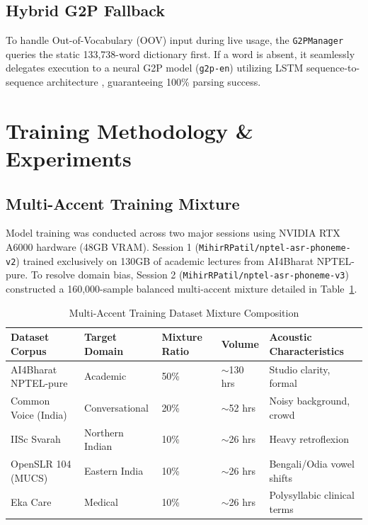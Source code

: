 \documentclass[11pt,a4paper]{article}
\begin{document}
\subsection{Hybrid G2P Fallback}
To handle Out-of-Vocabulary (OOV) input during live usage, the \texttt{G2PManager} queries the static 133,738-word dictionary first. If a word is absent, it seamlessly delegates execution to a neural G2P model (\texttt{g2p-en}) utilizing LSTM sequence-to-sequence architecture \cite{rao2015g2p}, guaranteeing 100\% parsing success.

\section{Training Methodology \& Experiments}\label{sec5}

\subsection{Multi-Accent Training Mixture}
Model training was conducted across two major sessions using NVIDIA RTX A6000 hardware (48GB VRAM). Session 1 (\texttt{MihirRPatil/}\allowbreak\texttt{nptel-asr-phoneme-v2}) trained exclusively on 130GB of academic lectures from AI4Bharat NPTEL-pure. To resolve domain bias, Session 2 (\texttt{MihirRPatil/}\allowbreak\texttt{nptel-asr-phoneme-v3}) constructed a 160,000-sample balanced multi-accent mixture detailed in Table~\ref{tab:dataset_composition}.

\begin{table}[h]
    \centering
    \caption{Multi-Accent Training Dataset Mixture Composition}\label{tab:dataset_composition}
    \vspace{0.5em}
    \begin{tabular}{p{3.5cm} p{3.0cm} p{1.8cm} p{1.8cm} p{4.0cm}}
        \toprule
        \textbf{Dataset Corpus} & \textbf{Target Domain} & \textbf{Mixture Ratio} & \textbf{Volume} & \textbf{Acoustic Characteristics} \\
        \midrule
        AI4Bharat NPTEL-pure & Academic & 50\% & $\sim$130 hrs & Studio clarity, formal \\
        Common Voice (India) & Conversational & 20\% & $\sim$52 hrs & Noisy background, crowd \\
        IISc Svarah & Northern Indian & 10\% & $\sim$26 hrs & Heavy retroflexion \\
        OpenSLR 104 (MUCS) & Eastern India & 10\% & $\sim$26 hrs & Bengali/Odia vowel shifts \\
        Eka Care & Medical & 10\% & $\sim$26 hrs & Polysyllabic clinical terms \\
        \bottomrule
    \end{tabular}
\end{table}
\end{document}
